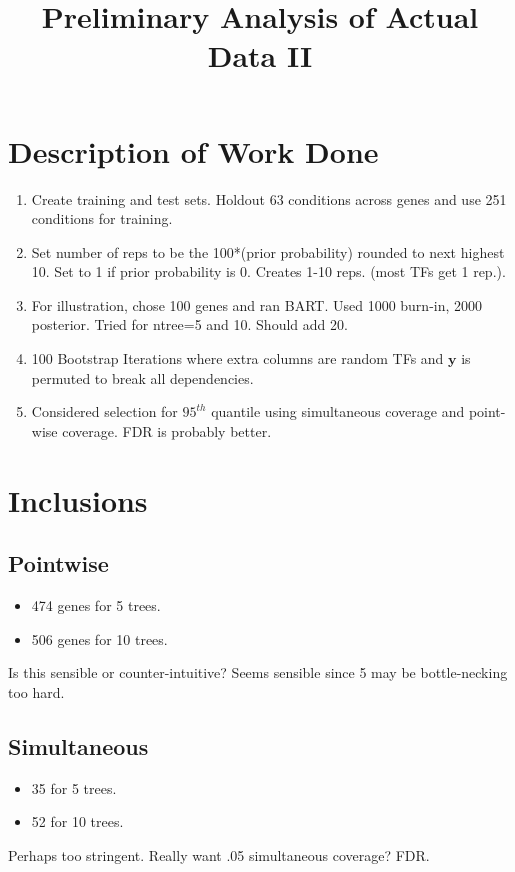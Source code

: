 \documentclass[12pt]{article}
\title{Preliminary Analysis of Actual Data II}
\begin{document}
\maketitle

\section{Description of Work Done}
\begin{enumerate}
\item Create training and test sets. Holdout 63 conditions across genes and use 251 conditions for training.
\item Set number of reps to be the 100*(prior probability) rounded to next highest 10. Set to 1 if prior probability is 0. Creates 1-10 reps. (most TFs get 1 rep.).
\item For illustration, chose 100 genes and ran BART. Used 1000 burn-in, 2000 posterior. Tried for ntree=5 and 10. Should add 20. 
\item 100 Bootstrap Iterations where extra columns are random TFs and $\mathbf{y}$ is permuted to break all dependencies. 
\item Considered selection for $95^{th}$ quantile using simultaneous coverage and point-wise coverage. FDR is probably better.  
\end{enumerate}

\newpage
\section{Inclusions}
\subsection*{Pointwise}
\begin{itemize}
\item 474 genes for 5 trees.
\item 506 genes for 10 trees.
\end{itemize}
Is this sensible or counter-intuitive? Seems sensible since 5 may be bottle-necking too hard.


\subsection*{Simultaneous}
\begin{itemize}
\item 35 for 5 trees.
\item 52 for 10 trees. 
\end{itemize}
Perhaps too stringent. Really want .05 simultaneous coverage? FDR.
\end{document}
